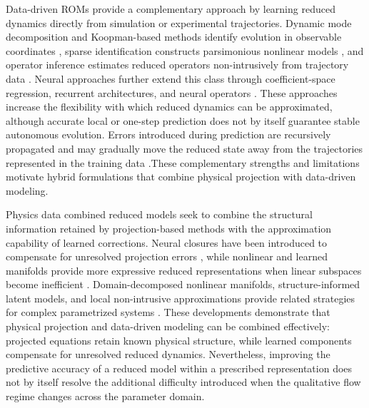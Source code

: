 Data-driven ROMs provide a complementary approach by learning reduced
dynamics directly from simulation or experimental trajectories. Dynamic mode
decomposition and Koopman-based methods identify evolution in observable
coordinates \cite{schmid2010,tu2014,williams2015}, sparse identification
constructs parsimonious nonlinear models
\cite{brunton2016,champion2019}, and operator inference estimates reduced
operators non-intrusively from trajectory data \cite{peherstorfer2016}.
Neural approaches further extend this class through coefficient-space
regression, recurrent architectures, and neural operators
\cite{hesthaven2018,pathak2018,vlachas2018,lu2021,li2021,kovachki2023}.
These approaches increase the flexibility with which reduced dynamics can be
approximated, although accurate local or one-step prediction does not by
itself guarantee stable autonomous evolution. Errors introduced during
prediction are recursively propagated and may gradually move the reduced
state away from the trajectories represented in the training data
\cite{duraisamy2019,brunton2020}.These complementary strengths and limitations motivate hybrid formulations that combine physical projection with data-driven modeling.

Physics data combined reduced models seek to combine the structural information retained by
projection-based methods with the approximation capability of learned
corrections. Neural closures have been introduced to compensate for
unresolved projection errors \cite{dar2023}, while nonlinear and learned
manifolds provide more expressive reduced representations when linear
subspaces become inefficient \cite{lee2020,fresca2022,geelen2023}.
Domain-decomposed nonlinear manifolds, structure-informed latent models, and
local non-intrusive approximations provide related strategies for complex
parametrized systems \cite{diaz2024,park2024,discacciati2024}. These
developments demonstrate that physical projection and data-driven modeling
can be combined effectively: projected equations retain known physical
structure, while learned components compensate for unresolved reduced
dynamics. Nevertheless, improving the predictive accuracy of a reduced model
within a prescribed representation does not by itself resolve the additional
difficulty introduced when the qualitative flow regime changes across the
parameter domain.

